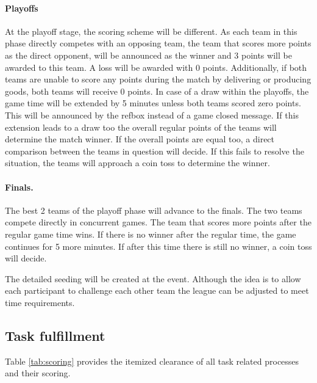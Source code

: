 \documentclass[12pt,twoside]{article}
\begin{document}
\paragraph{Playoffs}
At the playoff stage, the scoring scheme will be different. As each
team in this phase directly competes with an opposing team, the team
that scores more points as the direct opponent, will be announced as
the winner and 3 points will be awarded to this team. A loss will be
awarded with 0 points. Additionally, if both teams are unable to score
any points during the match by delivering or producing goods, both
teams will receive 0 points.
%
%
In case of a draw within the playoffs, the game time will be extended
by 5 minutes unless both teams scored zero points. This will be
announced by the refbox instead of a game closed message.
%
If this extension leads to a draw too the overall regular points of
the teams will determine the match winner. If the overall points are
equal too, a direct comparison between the teams in question will
decide. If this fails to resolve the situation, the teams will
approach a coin toss to determine the winner.



\paragraph{Finals.}
The best 2 teams of the playoff phase will advance to the finals.
The two teams compete directly in concurrent games. The team that
scores more points after the regular game time wins. If there is no
winner after the regular time, the game continues for 5 more
minutes. If after this time there is still no winner, a coin toss will
decide.

\bigskip
The detailed seeding will be created at the event. Although the idea
is to allow each participant to challenge each other team the league
can be adjusted to meet time requirements.


\subsection{Task fulfillment}
Table \ref{tab:scoring} provides the itemized clearance of all task
related processes and their scoring.
\end{document}
